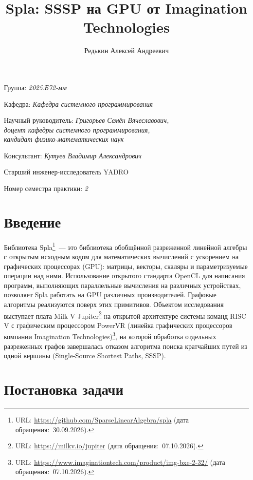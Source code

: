 \documentclass[a4paper]{article}
\title{Spla: SSSP на GPU от Imagination Technologies}
\author{Редькин Алексей Андреевич}
\date{}
\begin{document}
\maketitle

\begin{flushright}
    Группа: \emph{2025.Б72-мм}

    Кафедра: \emph{Кафедра системного программирования}

    Научный руководитель: \emph{Григорьев Семён Вячеславович,}\\
    \emph{доцент кафедры системного программирования,}\\
    \emph{кандидат физико-математических наук}

    Консультант: \emph{Кутуев Владимир Александрович}

    Старший инженер-исследователь YADRO

    Номер семестра практики: \emph{2}
\end{flushright}

\section{Введение}

Библиотека Spla\footnote{URL: \url{https://github.com/SparseLinearAlgebra/spla} (дата обращения:~30.09.2026).}~--- это библиотека обобщённой разреженной линейной алгебры с открытым исходным кодом для математических вычислений с ускорением на графических процессорах (GPU): матрицы, векторы, скаляры и параметризуемые операции над ними. Использование открытого стандарта OpenCL для написания программ, выполняющих параллельные вычисления на различных устройствах, позволяет Spla работать на GPU различных производителей. Графовые алгоритмы реализуются поверх этих примитивов. Объектом исследования выступает плата Milk-V Jupiter\footnote{URL: \url{https://milkv.io/jupiter} (дата обращения:~07.10.2026).} на открытой архитектуре системы команд RISC-V с графическим процессором PowerVR (линейка графических процессоров компании Imagination Technologies)\footnote{URL: \url{https://www.imaginationtech.com/product/img-bxe-2-32/} (дата обращения:~07.10.2026).}, на которой обработка отдельных разреженных графов завершалась отказом алгоритма поиска кратчайших путей из одной вершины (Single-Source Shortest Paths, SSSP).

\section{Постановка задачи}
\end{document}
